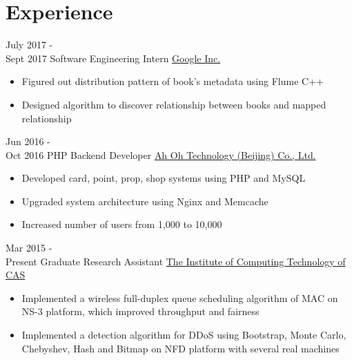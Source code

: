 \documentclass[a4paper]{twentysecondcv} %
\begin{document}
\makeprofile %



\section{Experience}

\begin{twenty} %
	\twentyitem
	{July 2017 - \\Sept 2017}
	{Software Engineering Intern}
	{\href{http://www.rgoogle.com/}{Google Inc.}}
	{}
	{
		{\begin{itemize}
				\item Figured out distribution pattern of book's metadata using Flume C++
				\item Designed algorithm to discover relationship between books and mapped  relationship
		\end{itemize}}
	}

	\twentyitem
    	{Jun 2016 - \\Oct 2016}
        {PHP Backend Developer}
        {\href{http://www.runorout.cn/}{Ah Oh Technology (Beijing) Co., Ltd.}}
        {}
        {
        {\begin{itemize}
        \item Developed card, point, prop, shop systems using PHP and MySQL
        \item Upgraded system architecture using Nginx and Memcache
        \item Increased number of users from 1,000 to 10,000
    \end{itemize}}
        }
    
    \twentyitem
	    {Mar 2015 - \\Present}
	    {Graduate Research Assistant}
	    {\href{http://english.ict.cas.cn/}{ The Institute of Computing Technology of CAS}}
	    {}
	    {
    	{\begin{itemize}
    			\item Implemented a wireless full-duplex queue scheduling algorithm of MAC on NS-3 platform, which improved throughput and fairness
    			\item Implemented a detection algorithm for DDoS using Bootstrap, Monte Carlo, Chebyshev, Hash and Bitmap on NFD platform with several real machines
    	\end{itemize}}
    }
        
\end{twenty}
\end{document}
